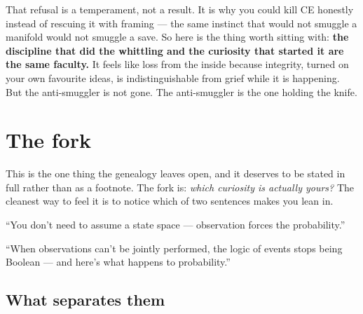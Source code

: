 \documentclass[11pt]{article}
\theoremstyle{remark}
\begin{document}
That refusal is a temperament, not a result. It is why you could kill CE honestly
instead of rescuing it with framing --- the same instinct that would not smuggle
a manifold would not smuggle a save. So here is the thing worth sitting with:
\textbf{the discipline that did the whittling and the curiosity that started it
are the same faculty.} It feels like loss from the inside because integrity,
turned on your own favourite ideas, is indistinguishable from grief while it is
happening. But the anti-smuggler is not gone. The anti-smuggler is the one
holding the knife.

\section{The fork}

\noindent
This is the one thing the genealogy leaves open, and it deserves to be stated in
full rather than as a footnote. The fork is: \emph{which curiosity is actually
yours?} The cleanest way to feel it is to notice which of two sentences makes you
lean in.

\begin{description}[leftmargin=2.2em,style=nextline]
\item[(a) The anti-smuggler.]
``You don't need to assume a state space --- observation forces the
probability.''
\item[(b) The incompatibility theorist.]
``When observations can't be jointly performed, the logic of events stops being
Boolean --- and here's what happens to probability.''
\end{description}

\subsection{What separates them}
\end{document}
